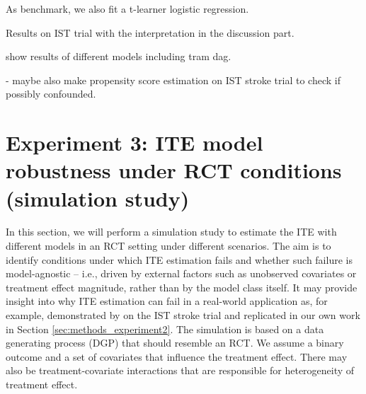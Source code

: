 As benchmark, we also fit a t-learner logistic regression.

Results on IST trial with the interpretation in the discussion part.


show results of different models including tram dag.

- maybe also make propensity score estimation on IST stroke trial to check if possibly confounded.




\section{Experiment 3: ITE model robustness under RCT conditions (simulation study)}

In this section, we will perform a simulation study to estimate the ITE with different models in an RCT setting under different scenarios. The aim is to identify conditions under which ITE estimation fails and whether such failure is model-agnostic -- i.e., driven by external factors such as unobserved covariates or treatment effect magnitude, rather than by the model class itself. It may provide insight into why ITE estimation can fail in a real-world application as, for example, demonstrated by \citet{chen2025} on the IST stroke trial and replicated in our own work in Section \ref{sec:methods_experiment2}. The simulation is based on a data generating process (DGP) that should resemble an RCT. We assume a binary outcome and a set of covariates that influence the treatment effect. There may also be treatment-covariate interactions that are responsible for heterogeneity of treatment effect. 


